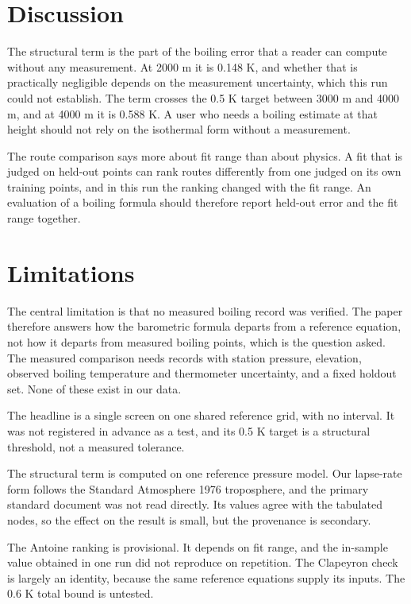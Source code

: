 \documentclass[11pt,letterpaper]{article}
\begin{document}
\section{Discussion}\label{sec:discussion}

The structural term is the part of the boiling error that a reader can compute without any measurement. At 2000 m it is 0.148 K, and whether that is practically negligible depends on the measurement uncertainty, which this run could not establish. The term crosses the 0.5 K target between 3000 m and 4000 m, and at 4000 m it is 0.588 K. A user who needs a boiling estimate at that height should not rely on the isothermal form without a measurement.

The route comparison says more about fit range than about physics. A fit that is judged on held-out points can rank routes differently from one judged on its own training points, and in this run the ranking changed with the fit range. An evaluation of a boiling formula should therefore report held-out error and the fit range together.

\section{Limitations}\label{sec:limitations}

The central limitation is that no measured boiling record was verified. The paper therefore answers how the barometric formula departs from a reference equation, not how it departs from measured boiling points, which is the question asked. The measured comparison needs records with station pressure, elevation, observed boiling temperature and thermometer uncertainty, and a fixed holdout set. None of these exist in our data.

The headline is a single screen on one shared reference grid, with no interval. It was not registered in advance as a test, and its 0.5 K target is a structural threshold, not a measured tolerance.

The structural term is computed on one reference pressure model. Our lapse-rate form follows the Standard Atmosphere 1976 troposphere, and the primary standard document was not read directly. Its values agree with the tabulated nodes, so the effect on the result is small, but the provenance is secondary.

The Antoine ranking is provisional. It depends on fit range, and the in-sample value obtained in one run did not reproduce on repetition. The Clapeyron check is largely an identity, because the same reference equations supply its inputs. The 0.6 K total bound is untested.
\end{document}
